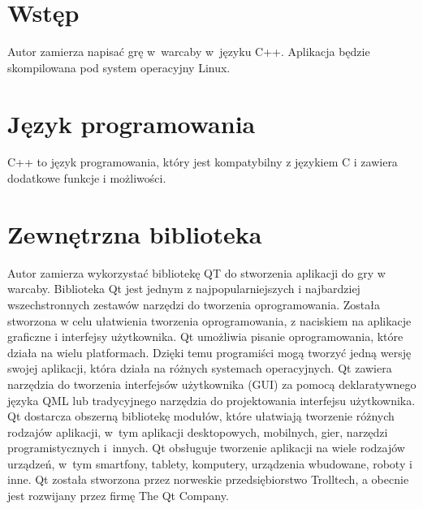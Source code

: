 \documentclass[12pt,twoside,a4paper]{article}
\begin{document}
\thispagestyle{empty}



\section{Wstęp}
Autor zamierza napisać grę w~warcaby w~języku C++. Aplikacja będzie skompilowana pod system operacyjny Linux.

\section{Język programowania}

C++ to język programowania, który jest kompatybilny z językiem C i zawiera dodatkowe funkcje i możliwości.

\section{Zewnętrzna biblioteka}

Autor zamierza wykorzystać bibliotekę QT do stworzenia aplikacji do gry w warcaby.
Biblioteka Qt jest jednym z najpopularniejszych i najbardziej wszechstronnych zestawów narzędzi do tworzenia oprogramowania.
Została stworzona w celu ułatwienia tworzenia oprogramowania, z naciskiem na aplikacje graficzne i interfejsy użytkownika. 
Qt umożliwia pisanie oprogramowania, które działa na wielu platformach. Dzięki temu programiści mogą tworzyć jedną wersję swojej aplikacji, która działa na różnych systemach operacyjnych.
Qt zawiera narzędzia do tworzenia interfejsów użytkownika (GUI) za pomocą deklaratywnego języka QML
lub tradycyjnego narzędzia do projektowania interfejsu użytkownika. 
Qt dostarcza obszerną bibliotekę modułów, które ułatwiają tworzenie różnych rodzajów aplikacji, w~tym aplikacji desktopowych, mobilnych, gier, narzędzi programistycznych i~innych.
Qt obsługuje tworzenie aplikacji na wiele rodzajów urządzeń, w~tym smartfony, tablety, komputery, urządzenia wbudowane, roboty i inne.
Qt została stworzona przez norweskie przedsiębiorstwo Trolltech, a obecnie jest rozwijany przez firmę The Qt Company. 
\end{document}
